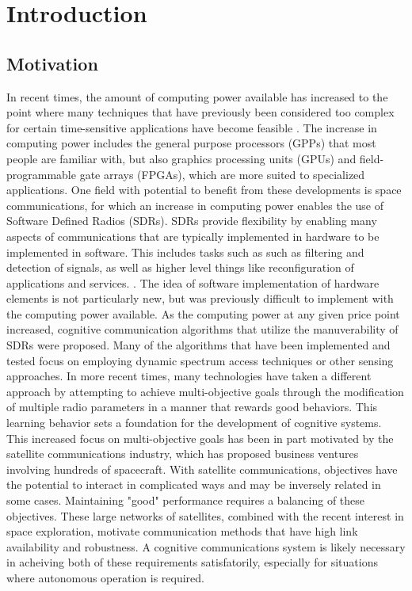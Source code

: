 \chapter{Introduction}
\section{Motivation}
\par In recent times, the amount of computing power available has increased to the point where many techniques that have previously been considered too complex for certain time-sensitive applications have become feasible \cite{computationPower_ML}. The increase in computing power includes the general purpose processors (GPPs) that most people are familiar with, but also graphics processing units (GPUs) and field-programmable gate arrays (FPGAs), which are more suited to specialized applications. One field with potential to benefit from these developments is space communications, for which an increase in computing power enables the use of Software Defined Radios (SDRs)\cite{tim1, tim2}. SDRs provide flexibility by enabling many aspects of communications that are typically implemented in hardware to be implemented in software. This includes tasks such as such as filtering and detection of signals, as well as higher level things like reconfiguration of applications and services. \cite[p.~xxxiii]{SDRTextbook}. The idea of software implementation of hardware elements is not particularly new, but was previously difficult to implement with the computing power available. As the computing power at any given price point increased, cognitive communication algorithms that utilize the manuverability of SDRs were proposed. Many of the algorithms that have been implemented and tested focus on employing dynamic spectrum access techniques or other sensing approaches. In more recent times, many technologies have taken a different approach by attempting to achieve multi-objective goals through the modification of multiple radio parameters in a manner that rewards good behaviors. This learning behavior sets a foundation for the development of cognitive systems. This increased focus on multi-objective goals has been in part motivated by the satellite communications industry, which has proposed business ventures involving hundreds of spacecraft. With satellite communications, objectives have the potential to interact in complicated ways and may be inversely related in some cases. Maintaining "good" performance requires a balancing of these objectives. These large networks of satellites, combined with the recent interest in space exploration, motivate communication methods that have high link availability and robustness\cite{paulo6}. A cognitive communications system is likely necessary in acheiving both of these requirements satisfatorily, especially for situations where autonomous operation is required.

